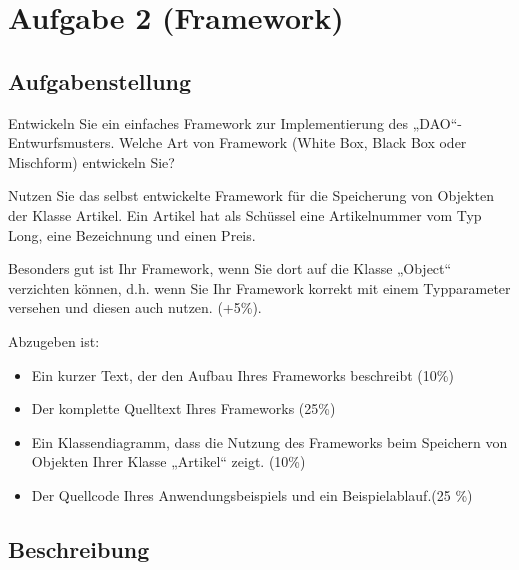 \section{Aufgabe 2 (Framework)}
\subsection{Aufgabenstellung}
Entwickeln Sie ein einfaches Framework zur Implementierung des „DAO“-Entwurfsmusters.
Welche Art von Framework (White Box, Black Box oder Mischform) entwickeln Sie?

Nutzen Sie das selbst entwickelte Framework für die Speicherung von Objekten der Klasse
Artikel. Ein Artikel hat als Schüssel eine Artikelnummer vom Typ Long, eine Bezeichnung
und einen Preis.

Besonders gut ist Ihr Framework, wenn Sie dort auf die Klasse „Object“ verzichten können,
d.h. wenn Sie Ihr Framework korrekt mit einem Typparameter versehen und diesen auch
nutzen. (+5\%).

Abzugeben ist:
\begin{itemize}
  \item Ein kurzer Text, der den Aufbau Ihres Frameworks beschreibt (10\%)
  \item Der komplette Quelltext Ihres Frameworks (25\%)
  \item Ein Klassendiagramm, dass die Nutzung des Frameworks beim Speichern von
Objekten Ihrer Klasse „Artikel“ zeigt. (10\%)
  \item Der Quellcode Ihres Anwendungsbeispiels und ein Beispielablauf.(25 \%)
\end{itemize}

\subsection{Beschreibung}
